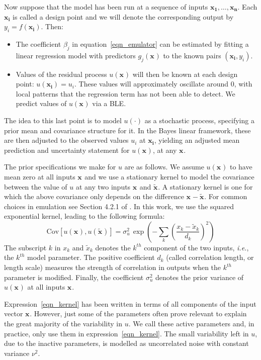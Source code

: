 \documentclass[preprint,12pt, sort&compress]{elsarticle}
\newcommand{\bd}[1]{\boldsymbol{#1}}
\newcommand{\x}[1][]{\bd{x_{#1}}}
\begin{document}
Now suppose that the model has been run at a sequence of inputs $\x[1], \dots, \x[n]$. Each $\x[i]$ is called a design point and we will denote the corresponding output by $y_i = f(\x[i])$. Then:
\begin{itemize}
\item The coefficient $\beta_j$ in equation~\eqref{eqn_emulator} can be estimated by fitting a linear regression model with predictors $g_j(\x)$ to the known pairs $(\x[i], y_i)$.
\item Values of the residual process $u(\x)$ will then be known at each design point: $u(\x[i])=u_i$. These values will approximately oscillate around $0$, with local patterns that the regression term has not been able to detect. We predict values of $u(\x)$ via a BLE.
\end{itemize}
The idea to this last point is to model $u(\cdot)$ as a stochastic process, specifying a prior mean and covariance structure for it. In the Bayes linear framework, these are then adjusted to the observed values $u_i$ at $\x[i]$, yielding an adjusted mean prediction and uncertainty statement for $u(\x)$, at any $\x$.

The prior specifications we make for $u$ are as follows. We assume $u(\x)$ to have mean zero at all inputs $\x$ and we use a stationary kernel to model the covariance between the value of $u$ at any two inputs $\x$ and $\widetilde{\x}$. A stationary kernel is one for which the above covariance only depends on the difference $\x - \widetilde{\x}$. For common choices in emulation see Section 4.2.1 of \cite{Rasmussen}. In this work, we use the squared exponential kernel, leading to the following formula:
\begin{equation}\label{eqn_kernel}
\text{Cov}[u(\x), u(\widetilde{\x})] = \sigma_u^2 \, \exp \left( - \sum_k \left(\frac{x_k - \widetilde{x}_k}{d_k}\right)^2 \right)
\end{equation}
The subscript $k$ in $x_k$ and $\widetilde{x}_k$ denotes the $k^{th}$ component of the two inputs, \textit{i.e.}, the $k^{th}$ model parameter. The positive coefficient $d_k$ (called correlation length, or length scale) measures the strength of correlation in outputs when the $k^{th}$ parameter is modified. Finally, the coefficient $\sigma_u^2$ denotes the prior variance of $u(\x)$ at all inputs $\x$.

Expression~\eqref{eqn_kernel} has been written in terms of all components of the input vector $\x$. However, just some of the parameters often prove relevant to explain the great majority of the variability in $u$. We call these active parameters and, in practice, only use them in expression~\eqref{eqn_kernel}. The small variability left in $u$, due to the inactive parameters, is modelled as uncorrelated noise with constant variance $\nu^2$.
\end{document}
